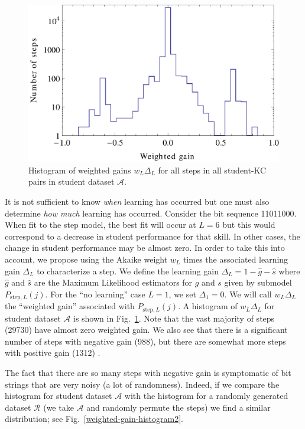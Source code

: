 \documentclass{acmlarge-edm}
\begin{document}
\begin{figure}
  \centering \includegraphics{weighted-gain-histogram.eps}
   \caption{Histogram of weighted gains $w_L \Delta_L$ for
     all steps in all student-KC pairs in student dataset $\mathcal{A}$.}
    \label{weighted-gain-histogram}
\end{figure}

It is not sufficient to know {\it when} learning has occurred but 
one must also determine {\it how much} learning has occurred.  
Consider the bit sequence 11011000.   When fit to the step model,  
the best fit will occur at $L=6$ but this would correspond to a
decrease in student performance for that skill.  In other cases, the 
change in student performance may be almost zero.  
In order to take this into account, we propose 
using the Akaike weight $w_L$ times the associated learning gain $\Delta_L$
to characterize a step.
We define the learning gain $\Delta_L=1-\hat{g}-\hat{s}$ where $\hat{g}$ and $\hat{s}$
are the Maximum Likelihood estimators for $g$ and $s$ given
by submodel $P_{\mathrm{step},L}(j)$.   For the ``no learning''
case $L=1$, we set $\Delta_1=0$.
We will call  $w_L \Delta_L$ the ``weighted gain'' associated with 
$P_{\mathrm{step},L}(j)$.
A histogram of $w_L \Delta_L$ for student dataset $\mathcal{A}$ is
shown in Fig.~\ref{weighted-gain-histogram}.  Note that the vast
majority of steps (29730) have almost zero weighted gain.  
We also see that there
is a significant number of steps with negative gain (988),
but there are somewhat more steps with positive gain (1312) .

The fact that there are so many steps with negative gain is
symptomatic of bit strings that are very noisy (a lot of
randomness).  Indeed, if we compare the histogram for student
dataset $\mathcal{A}$ with the histogram for a randomly 
generated dataset $\mathcal{R}$ (we take $\mathcal{A}$ and
randomly permute the steps) we find a similar distribution;
see Fig.~\ref{weighted-gain-histogram2}.
\end{document}
